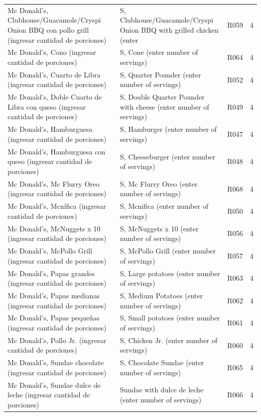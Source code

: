 {\begin{longtable}{p{4.3cm}p{5.5cm}p{1.5cm}p{0.7cm}}
Mc Donald’s, Clubhouse/Guacamole/Cryspi Onion BBQ con pollo grill (ingresar cantidad de porciones) & S, Clubhouse/Guacamole/Cryspi Onion BBQ with grilled chicken (enter & R059 & 4\\
Mc Donald’s, Cono (ingresar cantidad de porciones) & S, Cone (enter number of servings) & R064 & 4\\
Mc Donald’s, Cuarto de Libra (ingresar cantidad de porciones) & S, Quarter Pounder (enter number of servings) & R052 & 4\\
Mc Donald’s, Doble Cuarto de Libra con queso (ingresar cantidad de porciones) & S, Double Quarter Pounder with cheese (enter number of servings) & R049 & 4\\
Mc Donald’s, Hamburguesa (ingresar cantidad de porciones) & S, Hamburger (enter number of servings) & R047 & 4\\
Mc Donald’s, Hamburguesa con queso (ingresar cantidad de porciones) & S, Cheeseburger (enter number of servings) & R048 & 4\\
Mc Donald’s, Mc Flurry Oreo (ingresar cantidad de porciones) & S, Mc Flurry Oreo (enter number of servings) & R068 & 4\\
Mc Donald’s, Mcnífica (ingresar cantidad de porciones) & S, Mcnifica (enter number of servings) & R050 & 4\\
Mc Donald’s, McNuggets x 10 (ingresar cantidad de porciones) & S, McNuggets x 10 (enter number of servings) & R056 & 4\\
Mc Donald’s, McPollo Grill (ingresar cantidad de porciones) & S, McPollo Grill (enter number of servings) & R057 & 4\\
Mc Donald’s, Papas grandes (ingresar cantidad de porciones) & S, Large potatoes (enter number of servings) & R063 & 4\\
Mc Donald’s, Papas medianas (ingresar cantidad de porciones) & S, Medium Potatoes (enter number of servings) & R062 & 4\\
Mc Donald’s, Papas pequeñas (ingresar cantidad de porciones) & S, Small potatoes (enter number of servings) & R061 & 4\\
Mc Donald’s, Pollo Jr. (ingresar cantidad de porciones) & S, Chicken Jr. (enter number of servings) & R060 & 4\\
Mc Donald’s, Sundae chocolate (ingresar cantidad de porciones) & S, Chocolate Sundae (enter number of servings) & R065 & 4\\
Mc Donald’s, Sundae dulce de leche (ingresar cantidad de porciones) & Sundae with dulce de leche (enter number of servings) & R066 & 4\\

\end{longtable}}
